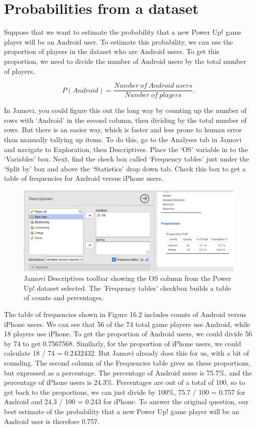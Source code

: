 \documentclass[
]{scrbook}
\begin{document}
\hypertarget{probabilities-from-a-dataset}{%
\section{Probabilities from a dataset}\label{probabilities-from-a-dataset}}

Suppose that we want to estimate the probability that a new Power Up! game player will be an Android user.
To estimate this probability, we can use the proportion of players in the dataset who are Android users.
To get this proportion, we need to divide the number of Android users by the total number of players,

\[P(Android) = \frac{Number\:of\:Android\:users}{Number\:of\:players}.\]

In Jamovi, you could figure this out the long way by counting up the number of rows with `Android' in the second column, then dividing by the total number of rows.
But there is an easier way, which is faster and less prone to human error than manually tallying up items.
To do this, go to the Analyses tab in Jamovi and navigate to Exploration, then Descriptives.
Place the `OS' variable in to the `Variables' box.
Next, find the check box called `Frequency tables' just under the `Split by' box and above the `Statistics' drop down tab.
Check this box to get a table of frequencies for Android versus iPhone users.

\begin{figure}
\includegraphics[width=1\linewidth]{img/jamovi_power_up_frequencies} \caption{Jamovi Descriptives toolbar showing the OS column from the Power Up! dataset selected. The 'Frequency tables' checkbox builds a table of counts and percentages.}\label{fig:unnamed-chunk-70}
\end{figure}

The table of frequencies shown in Figure 16.2 includes counts of Android versus iPhone users.
We can see that 56 of the 74 total game players use Android, while 18 players use iPhone.
To get the proportion of Android users, we could divide 56 by 74 to get 0.7567568.
Similarly, for the proportion of iPhone users, we could calculate 18 / 74 = 0.2432432.
But Jamovi already does this for us, with a bit of rounding.
The second column of the Frequencies table gives us these proportions, but expressed as a percentage.
The percentage of Android users is 75.7\%, and the percentage of iPhone users is 24.3\%.
Percentages are out of a total of 100, so to get back to the proportions, we can just divide by 100\%, 75.7 / 100 = 0.757 for Android and 24.3 / 100 = 0.243 for iPhone.
To answer the original question, our best estimate of the probability that a new Power Up! game player will be an Android user is therefore 0.757.
\end{document}
